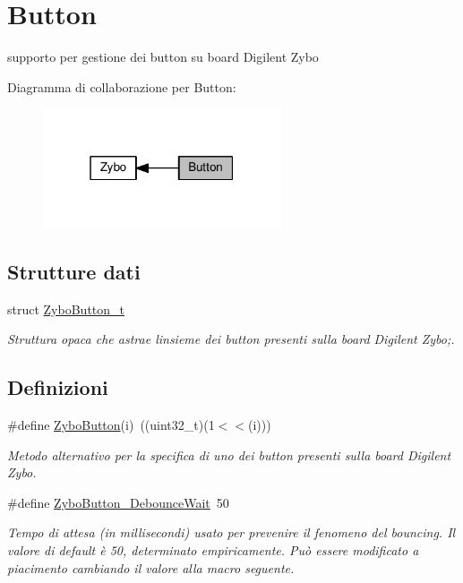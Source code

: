 \hypertarget{group___button}{}\section{Button}
\label{group___button}


supporto per gestione dei button su board Digilent Zybo  


Diagramma di collaborazione per Button\+:\nopagebreak
\begin{figure}[H]
\begin{center}
\leavevmode
\includegraphics[width=199pt]{group___button}
\end{center}
\end{figure}
\subsection*{Strutture dati}
\begin{DoxyCompactItemize}
\item 
struct \hyperlink{struct_zybo_button__t}{Zybo\+Button\+\_\+t}
\begin{DoxyCompactList}\small\item\em Struttura opaca che astrae l\textquotesingle{}insieme dei button presenti sulla board Digilent Zybo;. \end{DoxyCompactList}\end{DoxyCompactItemize}
\subsection*{Definizioni}
\begin{DoxyCompactItemize}
\item 
\#define \hyperlink{group___button_ga5f85cbc14732f1d83faa75500b67defa}{Zybo\+Button}(i)~((uint32\+\_\+t)(1$<$$<$(i)))
\begin{DoxyCompactList}\small\item\em Metodo alternativo per la specifica di uno dei button presenti sulla board Digilent Zybo. \end{DoxyCompactList}\item 
\#define \hyperlink{group___button_ga8960eefa6a431f50d4fe2a2f8063da3f}{Zybo\+Button\+\_\+\+Debounce\+Wait}~50
\begin{DoxyCompactList}\small\item\em Tempo di attesa (in millisecondi) usato per prevenire il fenomeno del bouncing. Il valore di default è 50, determinato empiricamente. Può essere modificato a piacimento cambiando il valore alla macro seguente. \end{DoxyCompactList}\end{DoxyCompactItemize}
